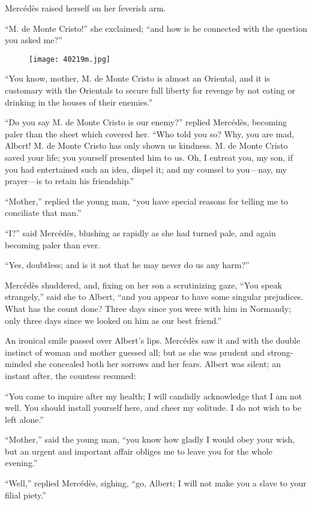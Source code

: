 Mercédès raised herself on her feverish arm.

“M. de Monte Cristo!” she exclaimed; “and how is he connected with the
question you asked me?”

\begin{figure}[ht]
\texttt{[image: 40219m.jpg]}
\end{figure}

“You know, mother, M. de Monte Cristo is almost an Oriental, and it is
customary with the Orientals to secure full liberty for revenge by not
eating or drinking in the houses of their enemies.”

“Do you say M. de Monte Cristo is our enemy?” replied Mercédès,
becoming paler than the sheet which covered her. “Who told you so? Why,
you are mad, Albert! M. de Monte Cristo has only shown us kindness. M.
de Monte Cristo saved your life; you yourself presented him to us. Oh,
I entreat you, my son, if you had entertained such an idea, dispel it;
and my counsel to you—nay, my prayer—is to retain his friendship.”

“Mother,” replied the young man, “you have special reasons for telling
me to conciliate that man.”

“I?” said Mercédès, blushing as rapidly as she had turned pale, and
again becoming paler than ever.

“Yes, doubtless; and is it not that he may never do us any harm?”

Mercédès shuddered, and, fixing on her son a scrutinizing gaze, “You
speak strangely,” said she to Albert, “and you appear to have some
singular prejudices. What has the count done? Three days since you were
with him in Normandy; only three days since we looked on him as our
best friend.”

An ironical smile passed over Albert’s lips. Mercédès saw it and with
the double instinct of woman and mother guessed all; but as she was
prudent and strong-minded she concealed both her sorrows and her fears.
Albert was silent; an instant after, the countess resumed:

“You came to inquire after my health; I will candidly acknowledge that
I am not well. You should install yourself here, and cheer my solitude.
I do not wish to be left alone.”

“Mother,” said the young man, “you know how gladly I would obey your
wish, but an urgent and important affair obliges me to leave you for
the whole evening.”

“Well,” replied Mercédès, sighing, “go, Albert; I will not make you a
slave to your filial piety.”

